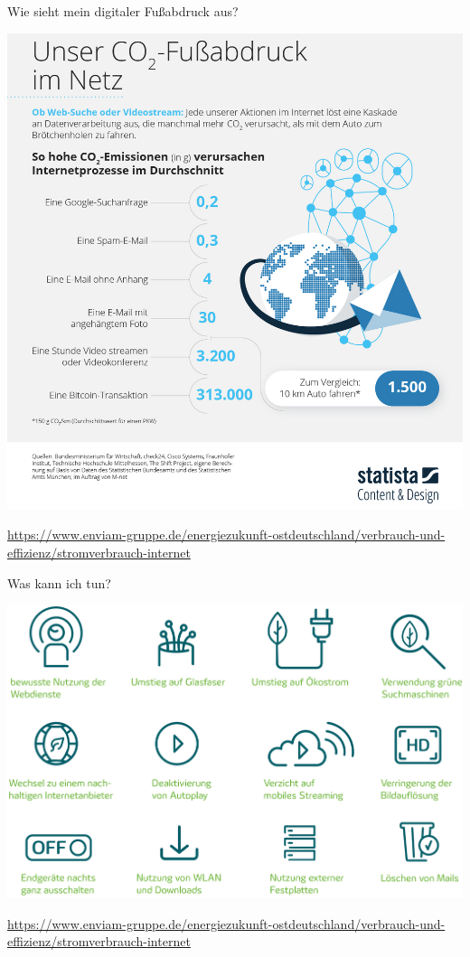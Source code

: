 \begin{frame}{Wie sieht mein digitaler Fußabdruck aus?}
		\begin{center}
			 \includegraphics[width=.85\textwidth]{../Figures/grafik-co2-fussabdruck-internet.jpg}
			
		\end{center}
		
 \href{https://www.enviam-gruppe.de/energiezukunft-ostdeutschland/verbrauch-und-effizienz/stromverbrauch-internet}%
{\tiny https://www.enviam-gruppe.de/energiezukunft-ostdeutschland/verbrauch-und-effizienz/stromverbrauch-internet}

\end{frame}		
\begin{frame}{Was kann ich tun?}
		\begin{center}
		   \includegraphics[width=.9\textwidth]{../Figures/grafik-nachhaltige-internetnutzung.jpg}
		\end{center}
		
 \href{https://www.enviam-gruppe.de/energiezukunft-ostdeutschland/verbrauch-und-effizienz/stromverbrauch-internet}%
{\tiny https://www.enviam-gruppe.de/energiezukunft-ostdeutschland/verbrauch-und-effizienz/stromverbrauch-internet}

\end{frame}		

